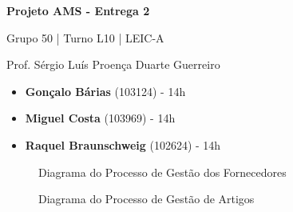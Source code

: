 \documentclass[12pt,a4paper]{article}
\begin{document}
\begin{titlepage}
  \begin{center}
    \vspace*{5cm}
    \Huge
    \textbf{Projeto AMS - Entrega 2}

    \vspace{0.5cm}
    \LARGE
    Grupo 50 | Turno L10 | LEIC-A

    \vspace{0.5cm}
    \large
    Prof. Sérgio Luís Proença Duarte Guerreiro

    \vfill
    \large
    \begin{minipage}{0.8\textwidth}
      \begin{itemize}
        \item[] \textbf{Gonçalo Bárias} (103124) - 14h
        \item[] \textbf{Miguel Costa} (103969) - 14h
        \item[] \textbf{Raquel Braunschweig} (102624) - 14h
      \end{itemize}
    \end{minipage}
  \end{center}
\end{titlepage}

%     
%
%     

\begin{landscape}
  \begin{figure}
    \centering
    
    \caption{Diagrama do Processo de Gestão dos Fornecedores}
    \label{fig:p1-fixed}
  \end{figure}
\end{landscape}

\begin{landscape}
  \begin{figure}
    \centering
    
    \caption{Diagrama do Processo de Gestão de Artigos}
    \label{fig:p2-fixed}
  \end{figure}
\end{landscape}
\end{document}
